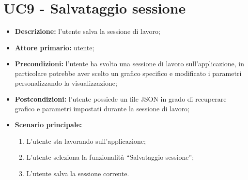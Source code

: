 \section{UC9 - Salvataggio sessione}
\begin{itemize}
  \item \textbf{Descrizione:} l'utente salva la sessione di lavoro;
  \item \textbf{Attore primario:} utente;
  \item \textbf{Precondizioni:} l'utente ha svolto una sessione di lavoro sull'applicazione, in particolare potrebbe aver scelto un grafico specifico e modificato i parametri personalizzando la visualizzazione;
  \item \textbf{Postcondizioni:} l'utente possiede un file JSON in grado di recuperare grafico e parametri impostati durante la sessione di lavoro;
  \item \textbf{Scenario principale:}
  \begin{enumerate}
    \item L'utente sta lavorando sull'applicazione;
    \item L'utente seleziona la funzionalità ``Salvataggio sessione'';
    \item L'utente salva la sessione corrente.
  \end{enumerate}
\end{itemize}

